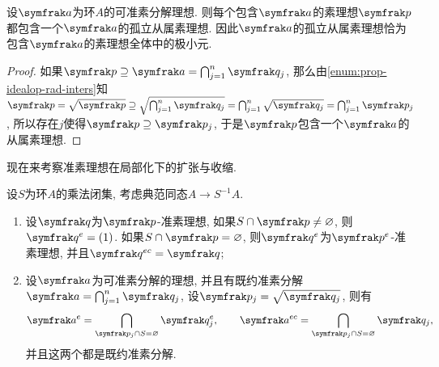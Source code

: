 \begin{proposition}
    设$\ideal{a}$为环$A$的可准素分解理想. 则每个包含$\ideal{a}$的素理想$\ideal{p}$都包含一个$\ideal{a}$的孤立从属素理想. 因此$\ideal{a}$的孤立从属素理想恰为包含$\ideal{a}$的素理想全体中的极小元.
\end{proposition}

\begin{proof}
    如果$\ideal{p}\supseteq\ideal{a}=\bigcap_{j=1}^n\ideal{q}_j$, 那么由\ref{enum:prop-idealop-rad-inters}知$\ideal{p}=\sqrt{\ideal{p}}\supseteq\sqrt{\bigcap_{j=1}^n\ideal{q}_j}=\bigcap_{j=1}^n\sqrt{\ideal{q}_j}=\bigcap_{j=1}^n\ideal{p}_j$, 所以存在$j$使得$\ideal{p}\supseteq\ideal{p}_j$, 于是$\ideal{p}$包含一个$\ideal{a}$的从属素理想.
\end{proof}

现在来考察准素理想在局部化下的扩张与收缩.

\begin{proposition}\label{prop:primlocal}设$S$为环$A$的乘法闭集, 考虑典范同态$A\to S^{-1}A$.
    \begin{enumerate}
        \item\label{enum:prop-primlocal-exten} 设$\ideal{q}$为$\ideal{p}$-准素理想, 如果$S\cap\ideal{p}\neq\varnothing$, 则$\ideal{q}^e=(1)$. 如果$S\cap\ideal{p}=\varnothing$, 则$\ideal{q}^e$为$\ideal{p}^e$-准素理想, 并且$\ideal{q}^{ec}=\ideal{q}$;
        \item\label{enum:prop-primlocal-decom} 设$\ideal{a}$为可准素分解的理想, 并且有既约准素分解$\ideal{a}=\bigcap_{j=1}^n\ideal{q}_j$, 设$\ideal{p}_j=\sqrt{\ideal{q}_j}$, 则有
        \begin{equation*}
            \ideal{a}^{e}=\bigcap_{\ideal{p}_j\cap S=\varnothing}\ideal{q}_j^e,
            \qquad \ideal{a}^{ec}=\bigcap_{\ideal{p}_j\cap S=\varnothing}\ideal{q}_j,
        \end{equation*}
        并且这两个都是既约准素分解.
    \end{enumerate}
\end{proposition}

